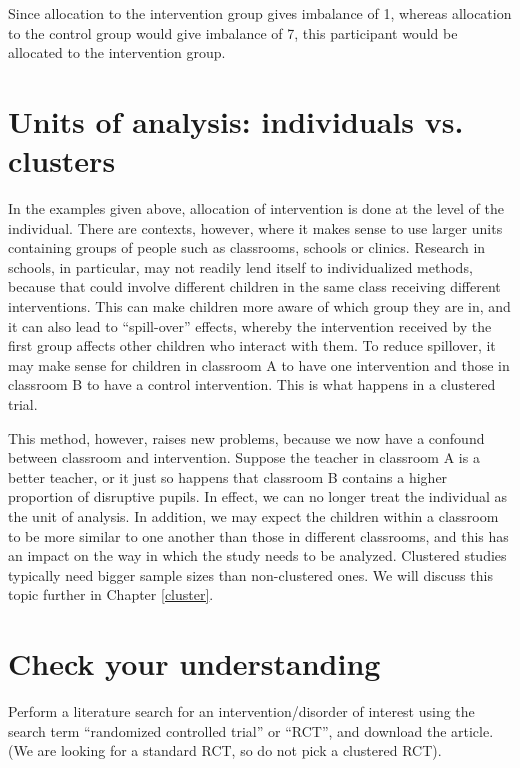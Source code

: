 \documentclass{krantz}
\begin{document}
Since allocation to the intervention group gives imbalance of 1, whereas allocation to the control group would give imbalance of 7, this participant would be allocated to the intervention group.

\hypertarget{units-of-analysis-individuals-vs-clusters}{%
\section{Units of analysis: individuals vs. clusters}\label{units-of-analysis-individuals-vs-clusters}}

In the examples given above, allocation of intervention is done at the level of the individual. There are contexts, however, where it makes sense to use larger units containing groups of people such as classrooms, schools or clinics. Research in schools, in particular, may not readily lend itself to individualized methods, because that could involve different children in the same class receiving different interventions. This can make children more aware of which group they are in, and it can also lead to ``spill-over'' effects, whereby the intervention received by the first group affects other children who interact with them. To reduce spillover, it may make sense for children in classroom A to have one intervention and those in classroom B to have a control intervention. This is what happens in a clustered trial.

This method, however, raises new problems, because we now have a confound between classroom and intervention. Suppose the teacher in classroom A is a better teacher, or it just so happens that classroom B contains a higher proportion of disruptive pupils. In effect, we can no longer treat the individual as the unit of analysis. In addition, we may expect the children within a classroom to be more similar to one another than those in different classrooms, and this has an impact on the way in which the study needs to be analyzed. Clustered studies typically need bigger sample sizes than non-clustered ones. We will discuss this topic further in Chapter \ref{cluster}.

\hypertarget{check-your-understanding-6}{%
\section{Check your understanding}\label{check-your-understanding-6}}

Perform a literature search for an intervention/disorder of interest using the search term ``randomized controlled trial'' or ``RCT'', and download the article. (We are looking for a standard RCT, so do not pick a clustered RCT).
\end{document}
